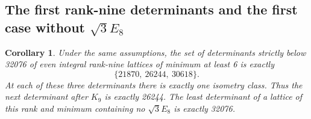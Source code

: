 \documentclass[11pt,a4paper]{article}
\newtheorem{corollary}[theorem]{Corollary}
\theoremstyle{remark}\newtheorem{remark}[theorem]{Remark}
\begin{document}
\subsection{The first rank-nine determinants and the first case without \texorpdfstring{$\sqrt3E_8$}{sqrt(3)E8}}

\begin{corollary}\label{cor:spectrum9}
Under the same assumptions, the set of determinants strictly below 32076 of even integral rank-nine lattices of minimum at least 6 is exactly
\[
\{21870,\ 26244,\ 30618\}.
\]
At each of these three determinants there is exactly one isometry class. Thus the next determinant after $K_9$ is exactly 26244. The least determinant of a lattice of this rank and minimum containing no $\sqrt3E_8$ is exactly 32076.
\end{corollary}
\end{document}
